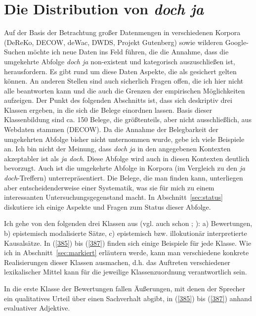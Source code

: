 \section{Die Distribution von \textit{doch ja}}
\label{sec:distributiondj}
Auf der Basis der Betrachtung großer Datenmengen in verschiedenen Korpora (DeReKo, DECOW, deWac, DWDS, Projekt Gutenberg) sowie \glq wilderen\grq {} Google-Suchen möchte ich neue Daten ins Feld führen, die die Annahme, dass die umge\-kehrte Abfolge \textit{doch ja} non-existent und kategorisch auszuschließen ist, herausfordern. Es gibt rund um diese Daten Aspekte, die als gesichert gelten können. An anderen Stellen sind auch sicherlich Fragen offen, die ich hier nicht alle beantworten kann und die auch die Grenzen der empirischen Möglichkeiten aufzeigen. Der Punkt des folgenden Abschnitts ist, dass sich deskriptiv drei Klassen ergeben, in die sich die Belege einordnen lassen. Basis dieser Klassenbildung sind ca. 150 Belege, die größtenteils, aber nicht ausschließlich, aus Webdaten stammen (DECOW). Da die Annahme der Belegbarkeit der umgekehrten Abfolge bisher nicht unternommen wurde, gebe ich viele Beispiele an. Ich bin nicht der Meinung, dass \textit{doch ja} in den angegebenen Kontexten akzeptabler ist als \textit{ja doch}. Diese Abfolge wird auch in diesen Kontexten deutlich bevorzugt. Auch ist die umgekehrte Abfolge in Korpora (im Vergleich zu den \textit{ja doch}-Treffern) unterrepräsentiert. Die Belege, die man finden kann, unterliegen aber entscheidenderweise einer Syste\-matik, was sie für mich zu einem interessanten Untersuchungsgegenstand macht. In Abschnitt~\ref{sec:status} diskutiere ich einige Aspekte und Fragen zum Status dieser Abfolge.
  
Ich gehe von den folgenden drei Klassen aus (vgl. auch schon \citealt[175-177]{Mueller2014a}; \citeyear[207-210]{Mueller2017b}): a)  Bewertungen, b)  epistemisch modalisierte Sätze, c)   epistemisch bzw. illokutionär interpretierte Kausalsätze. In (\ref{385}) bis (\ref{387}) finden sich einige Beispiele für jede Klasse. Wie ich in Abschnitt~\ref{sec:markiert} erläutern werde, kann man verschiedene konkrete Realisierungen dieser Klassen ausmachen, d.h. das Auftreten verschiedener lexikalischer Mittel kann für die jeweilige Klassenzuordnung verantwortlich sein. 

In die erste Klasse der Bewertungen fallen Äußerungen, mit denen der Sprecher ein qualitatives Urteil über einen Sachverhalt abgibt, in (\ref{385}) bis (\ref{387}) anhand  eva\-luativer Adjektive.

